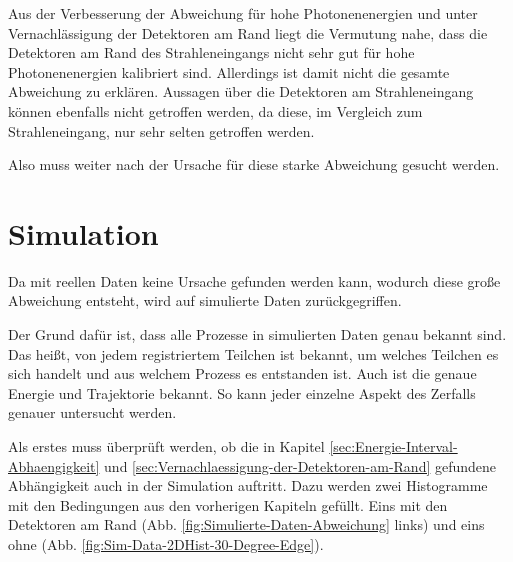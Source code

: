 \documentclass[a4paper,11pt,oneside,final,german,openbib,pdftex]{scrbook}
\begin{document}
{Aus der Verbesserung der Abweichung f\"ur hohe Photonenenergien und unter Vernachl\"assigung der Detektoren am Rand liegt die Vermutung nahe, dass die Detektoren am Rand des Strahleneingangs nicht sehr gut f\"ur hohe Photonenenergien kalibriert sind. 
Allerdings ist damit nicht die gesamte Abweichung zu erkl\"aren. 
Aussagen \"uber die Detektoren am Strahleneingang k\"onnen ebenfalls nicht getroffen werden, da diese, im Vergleich zum Strahleneingang, nur sehr selten getroffen werden.

Also muss weiter nach der Ursache f\"ur diese starke Abweichung gesucht werden.



\section{Simulation}
\label{sec:Simulation}

Da mit reellen Daten keine Ursache gefunden werden kann, wodurch diese gro{\ss}e Abweichung entsteht, wird auf simulierte Daten zur\"uckgegriffen. 

Der Grund daf\"ur ist, dass alle Prozesse in simulierten Daten genau bekannt sind. Das hei{\ss}t, von jedem registriertem Teilchen ist bekannt, um welches Teilchen es sich handelt und aus welchem Prozess es entstanden ist. Auch ist die genaue Energie und Trajektorie bekannt.
So kann jeder einzelne Aspekt des Zerfalls genauer untersucht werden.

Als erstes muss \"uberpr\"uft werden, ob die in Kapitel \ref{sec:Energie-Interval-Abhaengigkeit} und \ref{sec:Vernachlaessigung-der-Detektoren-am-Rand} gefundene Abh\"angigkeit auch in der Simulation auftritt. 
Dazu werden zwei Histogramme mit den Bedingungen aus den vorherigen Kapiteln gef\"ullt. Eins mit den Detektoren am Rand (Abb. \ref{fig:Simulierte-Daten-Abweichung} links) und eins ohne (Abb. \ref{fig:Sim-Data-2DHist-30-Degree-Edge}).


}
\end{document}
